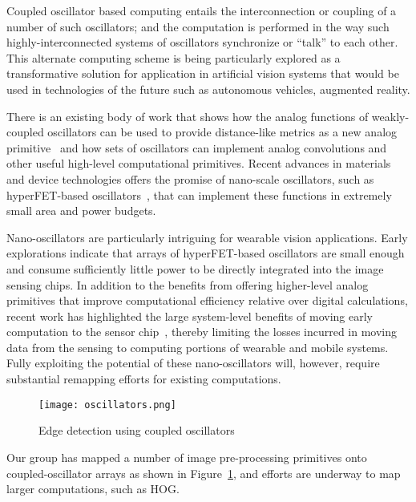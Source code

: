 Coupled oscillator based computing entails the interconnection 
or coupling of a number of such oscillators; 
and the computation is performed in the way 
such highly-interconnected systems of 
oscillators synchronize or ``talk'' to each other. 
This alternate computing scheme is 
being particularly explored as a transformative solution for 
application in artificial vision systems 
that would be used in technologies of the future such as autonomous vehicles, 
augmented reality.

There is an existing
body of work that shows how the analog functions of weakly-coupled
oscillators can be used to provide distance-like metrics as a new
analog primitive~\cite{upitt} and how sets of oscillators can implement
analog convolutions and other useful high-level computational
primitives. Recent advances in materials and device technologies
offers the promise of nano-scale oscillators, such as hyperFET-based
oscillators~\cite{wtsai}, that can implement these functions in extremely
small area and power budgets.

Nano-oscillators are particularly intriguing for wearable vision
applications. Early explorations indicate that arrays of
hyperFET-based oscillators are small enough and consume sufficiently
little power to be directly integrated into the image sensing
chips. In addition to the benefits from offering higher-level analog
primitives that improve computational efficiency relative over digital
calculations, recent work has highlighted the large system-level
benefits of moving early computation to the sensor chip~\cite{redeye},
thereby limiting the losses incurred in moving data from the sensing
to computing portions of wearable and mobile systems. Fully exploiting
the potential of these nano-oscillators will, however, require
substantial remapping efforts for existing computations. 

\begin{figure}[!htb]
\centering
\texttt{[image: oscillators.png]}
\caption{Edge detection using coupled oscillators}
\label{fig:osc}
\end{figure} 

Our group has
mapped a number of image pre-processing primitives onto
coupled-oscillator arrays as shown in Figure~\ref{fig:osc}, and efforts are underway to map larger
computations, such as HOG.

